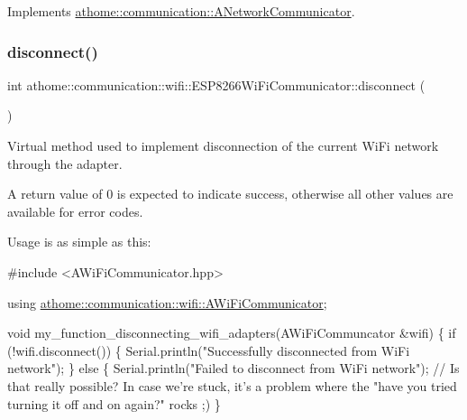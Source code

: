 Implements \mbox{\hyperlink{classathome_1_1communication_1_1_a_network_communicator_a370176dae8f38225446e83a132dbcff7}{athome\+::communication\+::\+A\+Network\+Communicator}}.

\mbox{\label{classathome_1_1communication_1_1wifi_1_1_e_s_p8266_wi_fi_communicator_a7e53e10b858aebc5e7c6c0ea6007f84a}} 
\subsubsection{\texorpdfstring{disconnect()}{disconnect()}}
{\footnotesize\ttfamily int athome\+::communication\+::wifi\+::\+E\+S\+P8266\+Wi\+Fi\+Communicator\+::disconnect (\begin{DoxyParamCaption}{ }\end{DoxyParamCaption})\hspace{0.3cm}{\ttfamily [virtual]}}

Virtual method used to implement disconnection of the current Wi\+Fi network through the adapter.

A return value of 0 is expected to indicate success, otherwise all other values are available for error codes.

Usage is as simple as this\+:


\begin{DoxyCode}
\textcolor{preprocessor}{#include <AWiFiCommunicator.hpp>}

\textcolor{keyword}{using} \mbox{\hyperlink{classathome_1_1communication_1_1wifi_1_1_a_wi_fi_communicator}{athome::communication::wifi::AWiFiCommunicator}};

\textcolor{keywordtype}{void} my\_function\_disconnecting\_wifi\_adapters(AWiFiCommuncator &wifi) \{
  \textcolor{keywordflow}{if} (!wifi.disconnect()) \{
    Serial.println(\textcolor{stringliteral}{"Successfully disconnected from WiFi network"});
  \} \textcolor{keywordflow}{else} \{
    Serial.println(\textcolor{stringliteral}{"Failed to disconnect from WiFi network"}); \textcolor{comment}{// Is that really possible? In case we're
       stuck, it's a problem where the "have you tried turning it off and on again?" rocks ;)}
\}
\end{DoxyCode}
 

